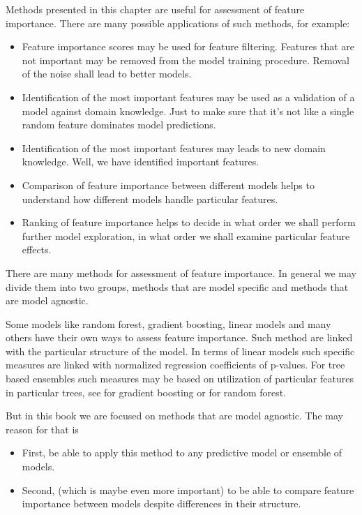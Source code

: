 \documentclass[12pt,]{krantz}
\providecommand{\tightlist}{%
  \setlength{\itemsep}{0pt}\setlength{\parskip}{0pt}}
\theoremstyle{definition}
\theoremstyle{definition}
\theoremstyle{definition}
\theoremstyle{remark}
\begin{document}
Methods presented in this chapter are useful for assessment of feature
importance. There are many possible applications of such methods, for
example:

\begin{itemize}
\tightlist
\item
  Feature importance scores may be used for feature filtering. Features
  that are not important may be removed from the model training
  procedure. Removal of the noise shall lead to better models.
\item
  Identification of the most important features may be used as a
  validation of a model against domain knowledge. Just to make sure that
  it's not like a single random feature dominates model predictions.
\item
  Identification of the most important features may leads to new domain
  knowledge. Well, we have identified important features.
\item
  Comparison of feature importance between different models helps to
  understand how different models handle particular features.
\item
  Ranking of feature importance helps to decide in what order we shall
  perform further model exploration, in what order we shall examine
  particular feature effects.
\end{itemize}

There are many methods for assessment of feature importance. In general
we may divide them into two groups, methods that are model specific and
methods that are model agnostic.

Some models like random forest, gradient boosting, linear models and
many others have their own ways to assess feature importance. Such
method are linked with the particular structure of the model. In terms
of linear models such specific measures are linked with normalized
regression coefficients of p-values. For tree based ensembles such
measures may be based on utilization of particular features in
particular trees, see \citep{xgboostExplainer} for gradient boosting or
\citep{randomForestExplainer} for random forest.

But in this book we are focused on methods that are model agnostic. The
may reason for that is

\begin{itemize}
\tightlist
\item
  First, be able to apply this method to any predictive model or
  ensemble of models.
\item
  Second, (which is maybe even more important) to be able to compare
  feature importance between models despite differences in their
  structure.
\end{itemize}
\end{document}
